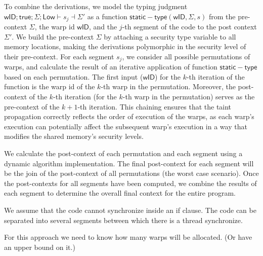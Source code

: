 To combine the derivations, we model the typing judgment $\mathsf{wID};\mathsf{true};  \Sigma; \mathsf{Low}\vdash s_j \dashv \Sigma'$ as a function $\mathsf{static-type} (\mathsf{wID}, \Sigma, s)$ from the pre-context $\Sigma$, the warp id $\mathsf{wID}$, and the $j$-th segment of the code to the post context $\Sigma'$.
We build the pre-context $\Sigma$ by attaching a security type variable to all memory locations, making the derivations polymorphic in the security level of their pre-context.
    For each segment $s_j$, we consider all possible permutations of warps, and calculate the result of an iterative application of function $\mathsf{static-type}$ based on each permutation. 
    The first input ($\mathsf{wID}$) for the $k$-th iteration of the function is the warp id of the $k$-th warp in the permutation.
    Moreover, the post-context of the $k$-th iteration (for the $k$-th warp in the permutation) serves as the pre-context of the $k+1$-th iteration.
    This chaining ensures that the taint propagation correctly reflects the order of execution of the warps, as each warp's execution can potentially affect the subsequent warp's execution in a way that modifies the shared memory's security levels.

    We calculate the post-context of each permutation and each segment using a dynamic algorithm implementation.
    The final post-context for each segment will be the join of the post-context of all permutations (the worst case scenario).
    Once the post-contexts for all segments have been computed, we combine the results of each segment to determine the overall final context for the entire program. 
    
We assume that the code cannot synchronize inside an if clause. The code can be separated into several segments between which there is a thread synchronize.

For this approach we need to know how many warps will be allocated.
(Or have an upper bound on it.)









